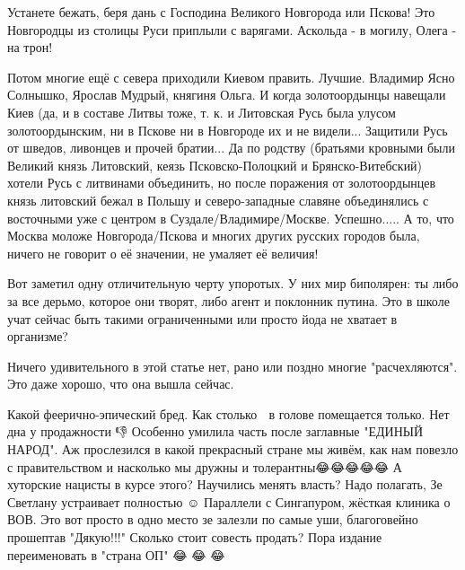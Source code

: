 \begin{itemize}
Устанете бежать, беря дань с Господина Великого Новгорода или Пскова! Это
Новгородцы из столицы Руси приплыли с варягами. Аскольда - в могилу, Олега - на
трон! 

Потом многие ещё с севера приходили Киевом править. Лучшие. Владимир Ясно
Солнышко, Ярослав Мудрый, княгиня Ольга. И когда золотоордынцы навещали Киев
(да, и в составе Литвы тоже, т. к. и Литовская Русь была улусом
золотоордынским, ни в Пскове ни в Новгороде их и не видели... Защитили Русь от
шведов, ливонцев и прочей братии... Да по родству (братьями кровными были
Великий князь Литовский, кеязь Псковско-Полоцкий и Брянско-Витебский) хотели
Русь с литвинами объединить, но после поражения от золотоордынцев князь
литовский бежал в Польшу и северо-западные славяне объединялись с восточными
уже с центром в Суздале/Владимире/Москве. Успешно..... А то, что Москва моложе
Новгорода/Пскова и многих других русских городов была, ничего не говорит о её
значении, не умаляет её величия!


 

Вот заметил одну отличительную черту упоротых. У них мир биполярен: ты либо за
все дерьмо, которое они творят, либо агент и поклонник путина. Это в школе учат
сейчас быть такими ограниченными или просто йода не хватает в организме?

 

Ничего удивительного в этой статье нет, рано или поздно многие "расчехляются".
Это даже хорошо, что она вышла сейчас.


 

Какой феерично-эпический бред. Как столько 💩 в голове помещается только. Нет
дна у продажности 👎 Особенно умилила часть после заглавные "ЕДИНЫЙ НАРОД". Аж
прослезился в какой прекрасный стране мы живём, как нам повезло с
правительством и насколько мы дружны и толерантны😂😂😂😂😂 А хуторские нацисты
в курсе этого? Научились менять власть? Надо полагать, Зе Светлану устраивает
полностью ☺️ Параллели с Сингапуром, жёсткая клиника о ВОВ. Это вот просто в
одно место зе залезли по самые уши, благоговейно прошептав "Дякую!!!" Сколько
стоит совесть продать? Пора издание переименовать в "страна ОП" 😂 😂 😂


\end{itemize}
